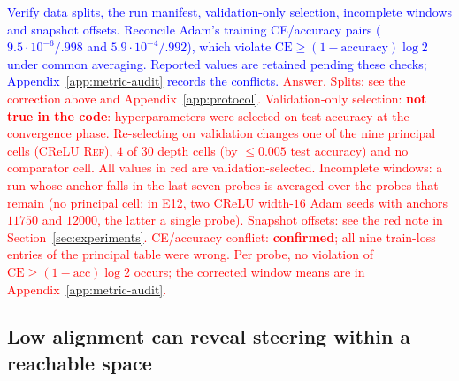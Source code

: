 \documentclass{article}
\newcommand{\zied}[1]{\textcolor{blue}{#1}}
\newcommand{\nat}[1]{\textcolor{red}{#1}}
\newcommand{\TOU}{\textsc{Ref}}
\theoremstyle{definition}
\theoremstyle{remark}
\begin{document}
\zied{Verify data splits, the run manifest, validation-only selection, incomplete windows and snapshot offsets. Reconcile Adam's training CE/accuracy pairs ($9.5\cdot10^{-6}/.998$ and $5.9\cdot10^{-4}/.992$), which violate $\mathrm{CE}\ge(1-\mathrm{accuracy})\log2$ under common averaging. Reported values are retained pending these checks; Appendix~\ref{app:metric-audit} records the conflicts.}
\nat{Answer. Splits: see the correction above and Appendix~\ref{app:protocol}. Validation-only selection: \textbf{not true in the code}: hyperparameters were selected on test accuracy at the convergence phase. Re-selecting on validation changes one of the nine principal cells (CReLU \TOU), $4$ of $30$ depth cells (by $\le0.005$ test accuracy) and no comparator cell. All values in red are validation-selected. Incomplete windows: a run whose anchor falls in the last seven probes is averaged over the probes that remain (no principal cell; in E12, two CReLU width-$16$ Adam seeds with anchors $11750$ and $12000$, the latter a single probe). Snapshot offsets: see the red note in Section~\ref{sec:experiments}. CE/accuracy conflict: \textbf{confirmed}; all nine train-loss entries of the principal table were wrong. Per probe, no violation of $\mathrm{CE}\ge(1-\mathrm{acc})\log2$ occurs; the corrected window means are in Appendix~\ref{app:metric-audit}.}

\subsection{Low alignment can reveal steering within a reachable space}
\end{document}
